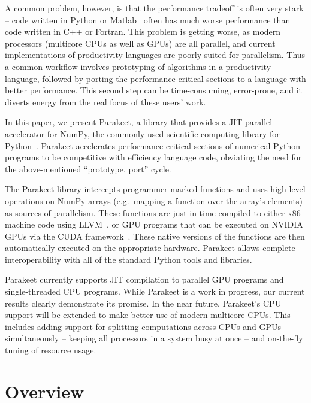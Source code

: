\documentclass[10pt,twocolumn]{article}
\begin{document}
A common problem, however, is that the performance tradeoff is often very stark -- code written in Python or Matlab~\cite{Moler80} often has much worse performance than code written in C++ or Fortran.  This problem is getting worse, as modern processors (multicore CPUs as well as GPUs) are all parallel, and current implementations of productivity languages are poorly suited for parallelism.  Thus a common workflow involves prototyping of algorithms in a productivity language, followed by porting the performance-critical sections to a language with better performance.  This second step can be time-consuming, error-prone, and it diverts energy from the real focus of these users' work.

In this paper, we present Parakeet, a library that provides a JIT parallel accelerator for NumPy, the commonly-used scientific computing library for Python~\cite{Oliphant07}. Parakeet accelerates performance-critical sections of numerical Python programs to be competitive with efficiency language code, obviating the need for the above-mentioned ``prototype, port'' cycle.

The Parakeet library intercepts programmer-marked functions and uses high-level operations on NumPy arrays (e.g.~mapping a function over the array's elements) as sources of parallelism. These functions are just-in-time compiled to either x86 machine code using LLVM~\cite{Latt02}, or GPU programs that can be executed on NVIDIA GPUs via the CUDA framework~\cite{NvidCU}. These native versions of the functions are then automatically executed on the appropriate hardware. Parakeet allows complete interoperability with all of the standard Python tools and libraries.

Parakeet currently supports JIT compilation to parallel GPU programs and single-threaded CPU programs.  While Parakeet is a work in progress, our current results clearly demonstrate its promise.  In the near future, Parakeet's CPU support will be extended to make better use of modern multicore CPUs.  This includes adding support for splitting computations across CPUs and GPUs simultaneously -- keeping all processors in a system busy at once -- and on-the-fly tuning of resource usage.

\section{Overview}
\label{overview}
\end{document}
